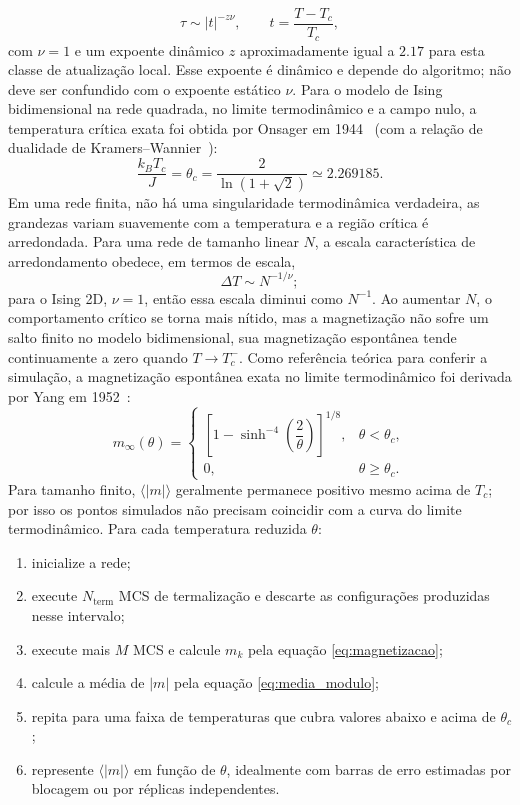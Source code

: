 \documentclass[12pt,a4paper]{article}
\newcommand{\thetaT}{\theta}
\begin{document}
%
\begin{equation}
    \tau\sim |t|^{-z\nu},\qquad t=\frac{T-T_c}{T_c},
\end{equation}
%
com $\nu=1$ e um expoente dinâmico $z$ aproximadamente igual a $2.17$ para esta classe de atualização local. Esse expoente é dinâmico e depende do algoritmo; não deve ser confundido com o expoente estático $\nu$.
%
Para o modelo de Ising bidimensional na rede quadrada, no limite termodinâmico e a campo
nulo, a temperatura crítica exata foi obtida por Onsager em 1944~\cite{Onsager1944}
(com a relação de dualidade de Kramers--Wannier~\cite{KramersWannier1941}):
%
\begin{equation}
    \frac{k_BT_c}{J}=\thetaT_c
    =\frac{2}{\ln(1+\sqrt{2})}\simeq 2.269185.
    \label{eq:Tc}
\end{equation}
%
Em uma rede finita, não há uma singularidade termodinâmica verdadeira, as grandezas variam suavemente com a temperatura e a região crítica é arredondada. Para uma rede de tamanho linear $N$, a escala característica de arredondamento obedece, em termos de escala,
%
\begin{equation}
    \Delta T\sim N^{-1/\nu};
\end{equation}
%
para o Ising 2D, $\nu=1$, então essa escala diminui como $N^{-1}$. Ao aumentar $N$, o comportamento crítico se torna mais nítido, mas a magnetização não sofre um salto finito no modelo bidimensional, sua magnetização espontânea tende continuamente a zero quando $T\to T_c^-$. Como referência teórica para conferir a simulação, a magnetização espontânea exata no
limite termodinâmico foi derivada por Yang em 1952~\cite{Yang1952}:
%
\begin{equation}
    m_{\infty}(\thetaT)=
    \begin{cases}
    \left[1-\sinh^{-4}\!\left(\dfrac{2}{\thetaT}\right)\right]^{1/8},
        & \thetaT<\thetaT_c,\\[3mm]
    0, & \thetaT\geq\thetaT_c.
    \end{cases}
    \label{eq:magnetizacao_exata}
\end{equation}
%
Para tamanho finito, $\langle|m|\rangle$ geralmente permanece positivo mesmo acima de $T_c$; por isso os pontos simulados não precisam coincidir com a curva do limite termodinâmico. Para cada temperatura reduzida $\thetaT$:
%
\begin{enumerate}
    \item inicialize a rede;
    \item execute $N_{\mathrm{term}}$ MCS de termalização e descarte as configurações produzidas nesse intervalo;
    \item execute mais $M$ MCS e calcule $m_k$ pela equação \eqref{eq:magnetizacao};
    \item calcule a média de $|m|$ pela equação \eqref{eq:media_modulo};
    \item repita para uma faixa de temperaturas que cubra valores abaixo e acima de $\thetaT_c$;
    \item represente $\langle |m|\rangle$ em função de $\thetaT$, idealmente com barras de erro estimadas por blocagem ou por réplicas independentes.
\end{enumerate}
\end{document}
